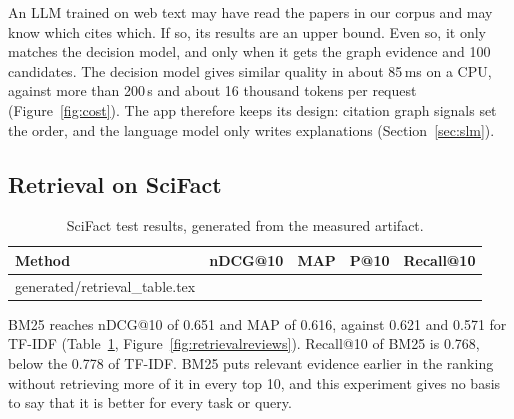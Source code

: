 \documentclass[11pt,a4paper]{article}
\makeatletter
\newcommand{\tableinput}[1]{\@@input#1 }
\makeatother
\begin{document}
An LLM trained on web text may have read the papers in our corpus and may know which cites which. If so, its results are an upper bound. Even so, it only matches the decision model, and only when it gets the graph evidence and 100 candidates. The decision model gives similar quality in about 85\,ms on a CPU, against more than 200\,s and about 16 thousand tokens per request (Figure~\ref{fig:cost}). The app therefore keeps its design: citation graph signals set the order, and the language model only writes explanations (Section~\ref{sec:slm}).

\subsection{Retrieval on SciFact}
\begin{table}[htbp]\centering\small
\begin{tabular}{@{}lrrrr@{}}\toprule
Method & nDCG@10 & MAP & P@10 & Recall@10\\\midrule
\tableinput{generated/retrieval_table.tex}
\bottomrule\end{tabular}\caption{SciFact test results, generated from the measured artifact.}\label{tab:retrieval}\end{table}
BM25 reaches nDCG@10 of 0.651 and MAP of 0.616, against 0.621 and 0.571 for TF-IDF (Table~\ref{tab:retrieval}, Figure~\ref{fig:retrievalreviews}). Recall@10 of BM25 is 0.768, below the 0.778 of TF-IDF. BM25 puts relevant evidence earlier in the ranking without retrieving more of it in every top 10, and this experiment gives no basis to say that it is better for every task or query.
\end{document}

